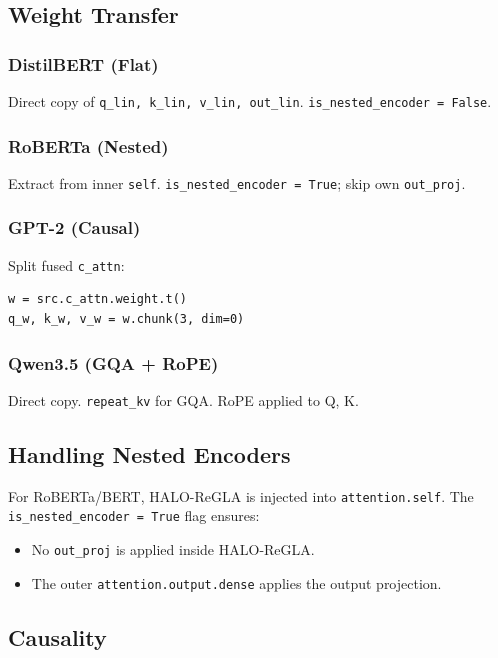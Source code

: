 \subsection{Weight Transfer}

\subsubsection{DistilBERT (Flat)}

Direct copy of \texttt{q\_lin, k\_lin, v\_lin, out\_lin}. \texttt{is\_nested\_encoder = False}.

\subsubsection{RoBERTa (Nested)}

Extract from inner \texttt{self}. \texttt{is\_nested\_encoder = True}; skip own \texttt{out\_proj}.

\subsubsection{GPT-2 (Causal)}

Split fused \texttt{c\_attn}:

\begin{lstlisting}
w = src.c_attn.weight.t()
q_w, k_w, v_w = w.chunk(3, dim=0)
\end{lstlisting}

\subsubsection{Qwen3.5 (GQA + RoPE)}

Direct copy. \texttt{repeat\_kv} for GQA. RoPE applied to Q, K.

\subsection{Handling Nested Encoders}

For RoBERTa/BERT, HALO-ReGLA is injected into \texttt{attention.self}. The 
\texttt{is\_nested\_encoder = True} flag ensures:
\begin{itemize}
\item No \texttt{out\_proj} is applied inside HALO-ReGLA.
\item The outer \texttt{attention.output.dense} applies the output projection.

\end{itemize}
\subsection{Causality}

